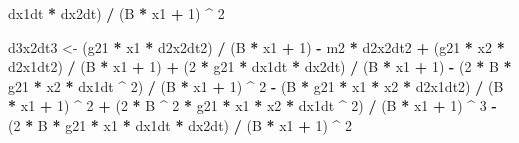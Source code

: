 \documentclass[12pt,twoside,openany]{reedthesis}
\newenvironment{Shaded}{\begin{snugshade}}{\end{snugshade}}
\newcommand{\DecValTok}[1]{\textcolor[rgb]{0.00,0.00,0.81}{#1}}
\newcommand{\StringTok}[1]{\textcolor[rgb]{0.31,0.60,0.02}{#1}}
\newcommand{\OperatorTok}[1]{\textcolor[rgb]{0.81,0.36,0.00}{\textbf{#1}}}
\newcommand{\NormalTok}[1]{#1}
\begin{document}
\begin{Shaded}
\begin{Highlighting}[]
\StringTok{  }\NormalTok{dx1dt }\OperatorTok{*}\StringTok{ }\NormalTok{dx2dt) }\OperatorTok{/}\StringTok{ }\NormalTok{(B }\OperatorTok{*}\StringTok{ }\NormalTok{x1 }\OperatorTok{+}\StringTok{ }\DecValTok{1}\NormalTok{) }\OperatorTok{^}\StringTok{ }\DecValTok{2}
  
\NormalTok{  d3x2dt3 <-}
\StringTok{  }\NormalTok{(g21 }\OperatorTok{*}\StringTok{ }\NormalTok{x1 }\OperatorTok{*}\StringTok{ }\NormalTok{d2x2dt2) }\OperatorTok{/}\StringTok{ }\NormalTok{(B }\OperatorTok{*}\StringTok{ }\NormalTok{x1 }\OperatorTok{+}\StringTok{ }\DecValTok{1}\NormalTok{) }\OperatorTok{-}\StringTok{ }\NormalTok{m2 }\OperatorTok{*}\StringTok{ }\NormalTok{d2x2dt2 }\OperatorTok{+}\StringTok{ }\NormalTok{(g21 }\OperatorTok{*}\StringTok{ }\NormalTok{x2 }\OperatorTok{*}\StringTok{ }\NormalTok{d2x1dt2) }\OperatorTok{/}
\StringTok{  }\NormalTok{(B }\OperatorTok{*}\StringTok{ }\NormalTok{x1 }\OperatorTok{+}\StringTok{ }\DecValTok{1}\NormalTok{) }\OperatorTok{+}\StringTok{ }\NormalTok{(}\DecValTok{2} \OperatorTok{*}\StringTok{ }\NormalTok{g21 }\OperatorTok{*}\StringTok{ }\NormalTok{dx1dt }\OperatorTok{*}\StringTok{ }\NormalTok{dx2dt) }\OperatorTok{/}\StringTok{ }\NormalTok{(B }\OperatorTok{*}\StringTok{ }\NormalTok{x1 }\OperatorTok{+}\StringTok{ }\DecValTok{1}\NormalTok{) }\OperatorTok{-}\StringTok{ }\NormalTok{(}\DecValTok{2} \OperatorTok{*}\StringTok{ }\NormalTok{B }\OperatorTok{*}\StringTok{ }\NormalTok{g21 }\OperatorTok{*}
\StringTok{  }\NormalTok{x2 }\OperatorTok{*}\StringTok{ }\NormalTok{dx1dt }\OperatorTok{^}\StringTok{ }\DecValTok{2}\NormalTok{) }\OperatorTok{/}\StringTok{ }\NormalTok{(B }\OperatorTok{*}\StringTok{ }\NormalTok{x1 }\OperatorTok{+}\StringTok{ }\DecValTok{1}\NormalTok{) }\OperatorTok{^}\StringTok{ }\DecValTok{2} \OperatorTok{-}\StringTok{ }\NormalTok{(B }\OperatorTok{*}\StringTok{ }\NormalTok{g21 }\OperatorTok{*}\StringTok{ }\NormalTok{x1 }\OperatorTok{*}\StringTok{ }\NormalTok{x2 }\OperatorTok{*}\StringTok{ }\NormalTok{d2x1dt2) }\OperatorTok{/}\StringTok{ }\NormalTok{(B }\OperatorTok{*}
\StringTok{  }\NormalTok{x1 }\OperatorTok{+}\StringTok{ }\DecValTok{1}\NormalTok{) }\OperatorTok{^}\StringTok{ }\DecValTok{2} \OperatorTok{+}\StringTok{ }\NormalTok{(}\DecValTok{2} \OperatorTok{*}\StringTok{ }\NormalTok{B }\OperatorTok{^}\StringTok{ }\DecValTok{2} \OperatorTok{*}\StringTok{ }\NormalTok{g21 }\OperatorTok{*}\StringTok{ }\NormalTok{x1 }\OperatorTok{*}\StringTok{ }\NormalTok{x2 }\OperatorTok{*}\StringTok{ }\NormalTok{dx1dt }\OperatorTok{^}\StringTok{ }\DecValTok{2}\NormalTok{) }\OperatorTok{/}\StringTok{ }\NormalTok{(B }\OperatorTok{*}\StringTok{ }\NormalTok{x1 }\OperatorTok{+}\StringTok{ }\DecValTok{1}\NormalTok{) }\OperatorTok{^}\StringTok{ }\DecValTok{3} \OperatorTok{-}\StringTok{ }\NormalTok{(}\DecValTok{2} \OperatorTok{*}
\StringTok{  }\NormalTok{B }\OperatorTok{*}\StringTok{ }\NormalTok{g21 }\OperatorTok{*}\StringTok{ }\NormalTok{x1 }\OperatorTok{*}\StringTok{ }\NormalTok{dx1dt }\OperatorTok{*}\StringTok{ }\NormalTok{dx2dt) }\OperatorTok{/}\StringTok{ }\NormalTok{(B }\OperatorTok{*}\StringTok{ }\NormalTok{x1 }\OperatorTok{+}\StringTok{ }\DecValTok{1}\NormalTok{) }\OperatorTok{^}\StringTok{ }\DecValTok{2}
  

\end{Highlighting}
\end{Shaded}
\end{document}
